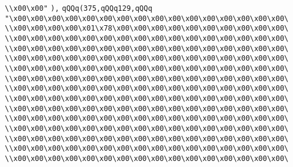 \verb|\\x00\x00"|\newline
\verb|),|\newline
\verb|qQQq(375,qQQq129,qQQq|\newline
\verb|"\x00\x00\x00\x00\x00\x00\x00\x00\x00\x00\x00\x00\x00\x00\x00\x00\|\newline
\verb|\\x00\x00\x00\x00\x01\x78\x00\x00\x00\x00\x00\x00\x00\x00\x00\x00\|\newline
\verb|\\x00\x00\x00\x00\x00\x00\x00\x00\x00\x00\x00\x00\x00\x00\x00\x00\|\newline
\verb|\\x00\x00\x00\x00\x00\x00\x00\x00\x00\x00\x00\x00\x00\x00\x00\x00\|\newline
\verb|\\x00\x00\x00\x00\x00\x00\x00\x00\x00\x00\x00\x00\x00\x00\x00\x00\|\newline
\verb|\\x00\x00\x00\x00\x00\x00\x00\x00\x00\x00\x00\x00\x00\x00\x00\x00\|\newline
\verb|\\x00\x00\x00\x00\x00\x00\x00\x00\x00\x00\x00\x00\x00\x00\x00\x00\|\newline
\verb|\\x00\x00\x00\x00\x00\x00\x00\x00\x00\x00\x00\x00\x00\x00\x00\x00\|\newline
\verb|\\x00\x00\x00\x00\x00\x00\x00\x00\x00\x00\x00\x00\x00\x00\x00\x00\|\newline
\verb|\\x00\x00\x00\x00\x00\x00\x00\x00\x00\x00\x00\x00\x00\x00\x00\x00\|\newline
\verb|\\x00\x00\x00\x00\x00\x00\x00\x00\x00\x00\x00\x00\x00\x00\x00\x00\|\newline
\verb|\\x00\x00\x00\x00\x00\x00\x00\x00\x00\x00\x00\x00\x00\x00\x00\x00\|\newline
\verb|\\x00\x00\x00\x00\x00\x00\x00\x00\x00\x00\x00\x00\x00\x00\x00\x00\|\newline
\verb|\\x00\x00\x00\x00\x00\x00\x00\x00\x00\x00\x00\x00\x00\x00\x00\x00\|\newline
\verb|\\x00\x00\x00\x00\x00\x00\x00\x00\x00\x00\x00\x00\x00\x00\x00\x00\|\newline
